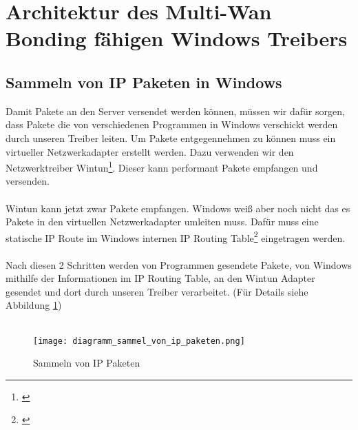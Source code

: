 \newpage
\section{Architektur des Multi-Wan Bonding fähigen Windows Treibers}
\subsection{Sammeln von IP Paketen in Windows}
Damit Pakete an den Server versendet werden können, müssen wir dafür sorgen, dass Pakete die von verschiedenen Programmen in Windows verschickt werden durch unseren Treiber leiten. Um Pakete entgegennehmen zu können muss ein virtueller Netzwerkadapter erstellt werden. Dazu verwenden wir den Netzwerktreiber Wintun\footnote[1]{\cite[Vgl.][]{1}}. Dieser kann performant Pakete empfangen und versenden.
\\\\
Wintun kann jetzt zwar Pakete empfangen. Windows weiß aber noch nicht das es Pakete in den virtuellen Netzwerkadapter umleiten muss. Dafür muss eine statische IP Route im Windows internen IP Routing Table\footnote[2]{\cite[Vgl.][]{2}} eingetragen werden.
\\\\
Nach diesen 2 Schritten werden von Programmen gesendete Pakete, von Windows mithilfe  der Informationen im IP Routing Table, an den Wintun Adapter gesendet und dort durch unseren Treiber verarbeitet. (Für Details siehe Abbildung \ref{driver-collect-packets})
\\\\
\begin{figure}[H]
    \centering
    \texttt{[image: diagramm\_sammel\_von\_ip\_paketen.png]}
    \caption[Sammeln von IP Paketen]{Sammeln von IP Paketen}
    \label{driver-collect-packets}
\end{figure}
\noindent

\newpage

